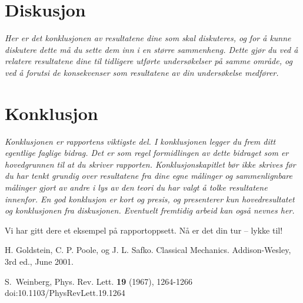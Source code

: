 \documentclass[5p]{elsarticle}
\begin{document}
\section{Diskusjon}
\textit{Her er det konklusjonen av resultatene dine som skal diskuteres, og
for å kunne diskutere dette må du sette dem inn i en større
sammenheng. Dette gjør du ved å relatere resultatene dine til
tidligere utførte undersøkelser på samme område, og ved å forutsi de
konsekvenser som resultatene av din undersøkelse medfører.}

\section{Konklusjon}
\textit{
Konklusjonen er rapportens viktigste del. I konklusjonen legger du frem ditt egentlige faglige bidrag. Det er som regel formidlingen av dette bidraget som er hovedgrunnen til at du skriver rapporten. Konklusjonskapitlet bør ikke skrives før du har tenkt grundig over resultatene fra dine egne målinger og sammenlignbare målinger gjort av andre i lys av den teori du har valgt å tolke resultatene innenfor. En god konklusjon er kort og presis, og presenterer kun hovedresultatet og konklusjonen fra diskusjonen. Eventuelt fremtidig arbeid kan også nevnes her. 
}

Vi har gitt dere et eksempel på rapportoppsett. Nå er det din tur -- lykke til!


\begin{thebibliography}{99}	%

H. Goldstein, C. P. Poole, og J. L. Safko. Classical Mechanics. Addison-Wesley, 3rd ed., June 2001.

S.~Weinberg,
Phys. Rev. Lett. \textbf{19} (1967), 1264-1266
doi:10.1103/PhysRevLett.19.1264


\end{thebibliography}
\end{document}

